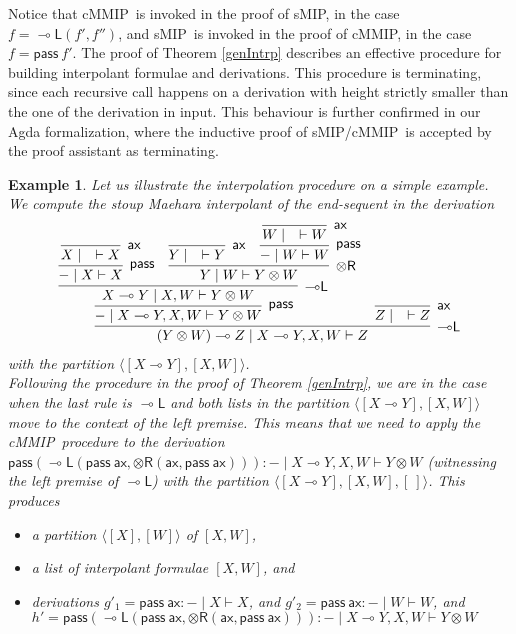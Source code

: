 \documentclass[sn-mathphys-num]{sn-jnl}%
\newcommand{\vd}{\vdash}
\newcommand{\tr}{\otimes\mathsf{R}}
\newcommand{\pass}{\mathsf{pass}}
\newcommand{\ax}{\mathsf{ax}}
\newcommand{\ot}{\otimes}
\newcommand{\lolli}{\multimap}
\newcommand{\lleft}{{\lolli}\mathsf{L}}
\newcommand{\sMIP}{\textsf{sMIP}}
\newcommand{\cMMIP}{\textsf{cMMIP}}
\theoremstyle{thmstyleone}%
\theoremstyle{thmstyletwo}%
\newtheorem{example}[theorem]{Example}%
\theoremstyle{thmstylethree}%
\begin{document}
Notice that \cMMIP~is invoked in the proof of \sMIP, in the case $f = \lleft(f',f'')$, and
\sMIP~is invoked in the proof of \cMMIP, in the case $f = \pass \ f'$.
The proof of Theorem \ref{genIntrp} describes an effective procedure for building interpolant formulae and derivations.
This procedure is terminating, since each recursive call happens on a derivation with height strictly smaller than the one of the derivation in input.
This behaviour is further confirmed in our Agda formalization, where the inductive proof of \sMIP/\cMMIP~is accepted by the proof assistant as terminating.

\begin{example}
  Let us illustrate the interpolation procedure on a simple example.
  We compute the stoup Maehara interpolant of the end-sequent in the derivation 
  \begin{equation}\label{example:interpolant}
    \begin{array}{c}
      \infer[\lleft]{(Y \ot W) \lolli Z \mid X \lolli Y , X, W \vd Z}{
      \infer[\pass]{{-} \mid X \lolli Y , X , W\vd Y \ot W}{
      \infer[\lleft]{X \lolli Y \mid X , W \vd Y \ot W}{
      \infer[\pass]{{-} \mid X \vd X}{
      \infer[\ax]{X \mid \quad \vd X}{}
      }
      &
      \infer[\tr]{Y \mid W \vd Y \ot W}{
      \infer[\ax]{Y \mid \quad \vd Y}{}
      &
      \infer[\pass]{{-} \mid W \vd W}{
      \infer[\ax]{W \mid \quad \vd W}{}
      }
      }
      }
      }
      &
      \infer[\ax]{Z \mid \quad \vd Z}{}
      }
    \end{array}
  \end{equation}
  with the partition $\langle [X \lolli Y] , [X, W]\rangle$.
  \\
  Following the procedure in the proof of Theorem \ref{genIntrp}, we are in the case when the last rule is $\lleft$ and both lists in the partition $\langle [X \lolli Y] , [X, W]\rangle$ move to the context of the left premise.
  This means that we need to apply the \cMMIP~procedure to the derivation $\pass (\lleft (\pass \ \ax, \tr (\ax , \pass \ \ax))) : {-} \mid X \lolli Y , X, W \vd Y \ot W$ (witnessing the left premise of $\lleft$) with the partition $\langle [X \lolli Y] , [X, W] , [\ ] \rangle$.
  This produces
  \begin{itemize}
    \item[--] a partition $\langle [X] , [W] \rangle$ of $[X, W]$,
    \item[--] a list of interpolant formulae $[X , W]$, and
    \item[--] derivations $g'_1 = \pass \ \ax : {-} \mid X \vd X$, and $g'_2 = \pass \ \ax : {-} \mid W \vd W$, and $h' = \pass (\lleft (\pass \ \ax, \tr (\ax , \pass \ \ax))) : {-} \mid X \lolli Y , X, W \vd Y \ot W$

\end{itemize}
\end{example}
\end{document}
